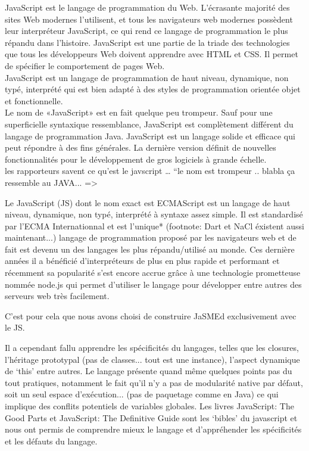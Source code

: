 \documentclass[pdftex,12pt,a4paper]{article}
\begin{document}
JavaScript est le langage de programmation du Web. L'écrasante majorité des sites Web modernes l'utilisent, et tous les navigateurs web modernes possèdent leur interpréteur JavaScript, ce qui rend ce langage de programmation le plus répandu dans l'histoire. 
JavaScript est une partie de la triade des technologies que tous les développeurs Web doivent apprendre avec HTML et CSS.
Il permet de spécifier le comportement de pages Web.\\
JavaScript est un langage de programmation de haut niveau, dynamique, non typé, interprété qui est bien adapté à des styles de programmation orientée objet et fonctionnelle.\\
Le nom de «JavaScript» est en fait quelque peu trompeur. Sauf pour une superficielle syntaxique ressemblance, JavaScript est complètement différent du langage de programmation Java. JavaScript est un langage solide et efficace qui peut répondre à des fins générales. 
La dernière version définit de nouvelles fonctionnalités pour le développement de gros logiciels à grande échelle.\\
les rapporteurs savent ce qu’est le javscript … “le nom est trompeur .. blabla ça ressemble au JAVA... =>



Le JavaScript (JS) dont le nom exact est ECMAScript est un langage de haut niveau, dynamique, non typé, interprété à syntaxe assez simple.
Il est standardisé par l’ECMA Internationnal et est l’unique* (footnote: Dart et NaCl éxistent aussi maintenant...) langage de programmation proposé par les navigateurs web et de fait est devenu un des langages les plus répandu/utilisé au monde. Ces dernière années il a bénéficié d’interpréteurs de plus en plus rapide et performant et récemment sa popularité s’est encore accrue grâce à une technologie prometteuse nommée node.js qui permet d’utiliser le langage pour développer entre autres des serveurs web très facilement.

C’est pour cela que nous avons choisi de construire JaSMEd exclusivement avec le JS. 

Il a cependant fallu apprendre les spécificités du langages, telles que les closures, l’héritage prototypal (pas de classes... tout est une instance), l’aspect dynamique de ‘this’ entre autres.
Le langage présente quand même quelques points pas du tout pratiques, notamment le fait qu’il n’y a pas de modularité native par défaut, soit un seul espace d’exécution... (pas de paquetage comme en Java) ce qui implique des conflits potentiels de variables globales.
Les livres JavaScript: The Good Parts et JavaScript: The Definitive Guide sont les ‘bibles’ du javascript et nous ont permis de comprendre mieux le langage et d’appréhender les spécificités et les défauts du langage.
\end{document}
